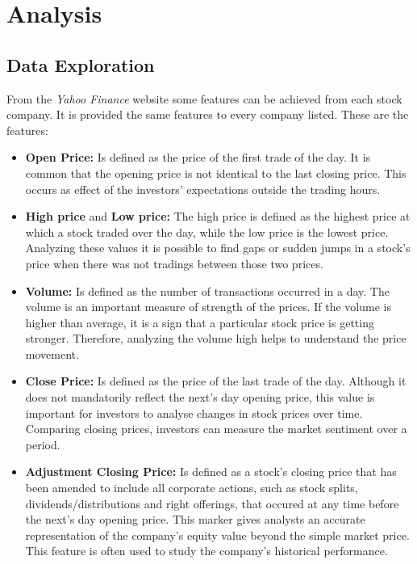 \section{Analysis}
\label{sec:analysis}

\subsection{Data Exploration}
\label{subsec:data_exploration}
From the \textit{Yahoo Finance} website some features can be achieved from each stock company. It is provided the same features to every company listed.
These are the features:\\
\begin{itemize}
  \item \textbf{Open Price:}
    Is defined as the price of the first trade of the day. It is common that the opening price is not identical
    to the last closing price. This occurs as effect of the investors' expectations outside the trading hours.\\
  \item \textbf{High price} and \textbf{Low price:}
    The high price is defined as the highest price at which a stock traded over the day, while the low price is the lowest price. Analyzing these values it is
    possible to find gaps or sudden jumps in a stock's price when there was not tradings between those two prices.\\ 
  \item \textbf{Volume:} 
    Is defined as the number of transactions occurred in a day. The volume is an important measure of strength of the prices. If the volume is 
    higher than average, it is a sign that a particular stock price is getting stronger. Therefore, analyzing the volume high helps to understand the price
    movement.\\

  \item \textbf{Close Price:}
    Is defined as the price of the last trade of the day. Although it does not mandatorily reflect the next's day opening price, this value is
    important for investors to analyse changes in stock prices over time. Comparing closing prices, investors can measure the market sentiment over a period.\\
 
  \item \textbf{Adjustment Closing Price:}
    Is defined as a stock's closing price that has been amended to include all corporate actions, such as stock splits, dividends/distributions and right offerings, that
    occured at any time before the next's day opening price. This marker gives analysts an accurate representation of the company's equity value beyond the simple market price.
    This feature is often used to study the company's historical performance.\\

\end{itemize} 
